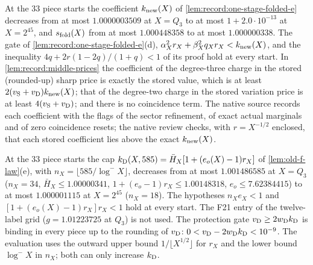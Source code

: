 \begin{certificate}\label{cert:record:one-stage}
At the $33$ piece starts the coefficient $k_{\rm new}(X)$ of
\cref{lem:record:one-stage-folded-e} decreases from at most $1.0000003509$ at
$X=Q_3$ to at most $1+2.0\cdot10^{-13}$ at $X=2^{45}$, and $s_{\rm fold}(X)$
from at most $1.000448358$ to at most $1.000000338$. The gate of
\cref{lem:record:one-stage-folded-e}(d),
$\alpha_X^2r_X+\beta_X^2q_Xr_X<k_{\rm new}(X)$, and the inequality
$4q+2r(1-2q)/(1+q)<1$ of its proof hold at every start. In
\cref{lem:record:middle-prices} the coefficient of the
degree-three charge in the stored (rounded-up) sharp price is
exactly the stored value, which is at least
$2(v_{\rm S}+v_{\rm D})k_{\rm new}(X)$; that of the degree-two
charge in the stored variation price is at least
$4(v_{\rm S}+v_{\rm D})$; and
there is no coincidence term. The native source records each coefficient with
the flags of the sector refinement, of exact actual marginals and of zero
coincidence resets; the native review checks, with $r=X^{-1/2}$ enclosed, that
each stored coefficient lies above the exact $k_{\rm new}(X)$.
\end{certificate}

\begin{certificate}\label{cert:record:old-f-cap}
At the $33$ piece starts the cap $k_{\rm D}(X,585)=\bar H_X[1+(e_o(X)-1)r_X]$ of
\cref{lem:old-f-law}(e), with $n_X=\lfloor585/\log^-X\rfloor$, decreases from
at most $1.001486585$ at $X=Q_3$ ($n_X=34$, $\bar H_X\le1.00000341$,
$1+(e_o-1)r_X\le1.00148318$, $e_o\le7.62384415$) to at most $1.000001115$ at
$X=2^{45}$ ($n_X=18$). The hypotheses $n_Xe_X<1$ and
$[1+(e_o(X)-1)r_X]r_X<1$ hold at every start. The F21 entry of the twelve-label
grid ($g=1.01223725$ at $Q_3$) is not used. The protection gate
$v_{\rm D}\ge2w_{\rm D}k_{\rm D}$ is binding in every piece up to the rounding
of $v_{\rm D}$: $0<v_{\rm D}-2w_{\rm D}k_{\rm D}<10^{-9}$. The evaluation uses the
outward upper bound $1/\lfloor X^{1/2}\rfloor$ for $r_X$ and the lower bound
$\log^-X$ in $n_X$; both can only increase $k_{\rm D}$.
\end{certificate}

